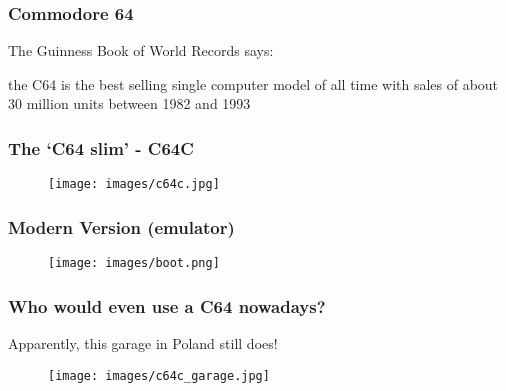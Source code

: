 \documentclass{beamer}
\begin{document}
\begin{frame}
\frametitle{Commodore 64}

The Guinness Book of World Records says:
\begin{displayquote}
the C64 is the best selling single computer model of all time with sales of about 30 million units between 1982 and 1993
\end{displayquote}

\end{frame}


{
\begin{frame}[plain]
\end{frame}
}



\begin{frame}
\frametitle{The `C64 slim' - C64C}

\begin{figure}
\texttt{[image: images/c64c.jpg]}
\end{figure}

\end{frame}


\begin{frame}
\frametitle{Modern Version (emulator)}

\begin{figure}
\texttt{[image: images/boot.png]}
\end{figure}

\end{frame}


\begin{frame}
\frametitle{Who would even use a C64 nowadays?}

Apparently, this garage in Poland still does!
\begin{figure}
\texttt{[image: images/c64c\_garage.jpg]}
\end{figure}

\end{frame}

\end{document}

